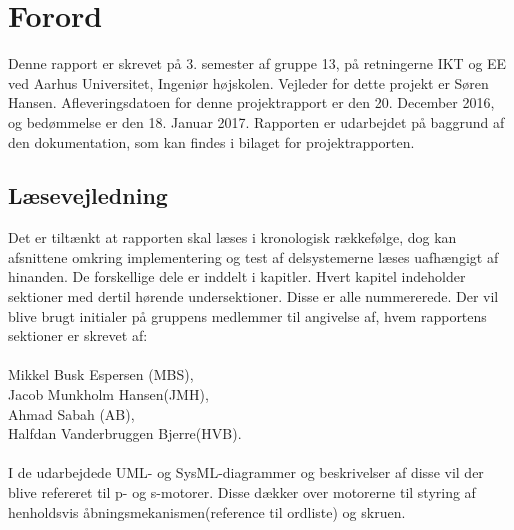 \chapter{Forord}
Denne rapport er skrevet på 3. semester af gruppe 13, på retningerne IKT og EE ved Aarhus Universitet, Ingeniør højskolen. 
Vejleder for dette projekt er Søren Hansen. Afleveringsdatoen for denne projektrapport er den 20. December 2016, og bedømmelse er den 18. Januar 2017.
Rapporten er udarbejdet på baggrund af den dokumentation, som kan findes i bilaget for projektrapporten.

\section{Læsevejledning}
Det er tiltænkt at rapporten skal læses i kronologisk rækkefølge, dog kan afsnittene omkring implementering og test af delsystemerne læses
uafhængigt af hinanden. De forskellige dele er inddelt i kapitler. Hvert kapitel indeholder sektioner med dertil hørende undersektioner. Disse er alle nummererede.
Der vil blive brugt initialer på gruppens medlemmer til angivelse af, hvem rapportens sektioner er skrevet af: \\
\\
Mikkel Busk Espersen (MBS), \\
Jacob Munkholm Hansen(JMH), \\
Ahmad Sabah (AB), \\
Halfdan Vanderbruggen Bjerre(HVB). \\
\\
I de udarbejdede UML- og SysML-diagrammer og beskrivelser af disse vil der blive refereret til p- og s-motorer. Disse dækker over motorerne til styring af henholdsvis åbningsmekanismen(reference til ordliste) og skruen.